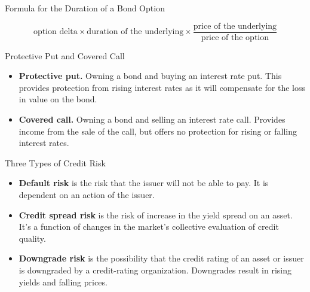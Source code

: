 \documentclass[../custom]{flashcards}
\begin{document}
\begin{flashcard}{Formula for the Duration of a Bond Option}
    \begin{flushleft}
        \[
            \text{option delta} \times \text{duration of the underlying} \times \frac{\text{price of the underlying}}{\text{price of the option}}
        \]
    \end{flushleft}
\end{flashcard}

\begin{flashcard}{Protective Put and Covered Call}
    \begin{itemize}
        \item \textbf{Protective put.} Owning a bond and buying an interest rate put. This provides protection from rising interest rates as it will compensate for the loss in value on the bond.
        \item \textbf{Covered call.} Owning a bond and selling an interest rate call. Provides income from the sale of the call, but offers no protection for rising or falling interest rates.
    \end{itemize}
\end{flashcard}

\begin{flashcard}{Three Types of Credit Risk}
    \begin{itemize}
        \item \textbf{Default risk} is the risk that the issuer will not be able to pay. It is dependent on an action of the issuer.
        \item \textbf{Credit spread risk} is the risk of increase in the yield spread on an asset. It's a function of changes in the market's collective evaluation of credit quality.
        \item \textbf{Downgrade risk} is the possibility that the credit rating of an asset or issuer is downgraded by a credit-rating organization. Downgrades result in rising yields and falling prices.
    \end{itemize}
\end{flashcard}
\end{document}
